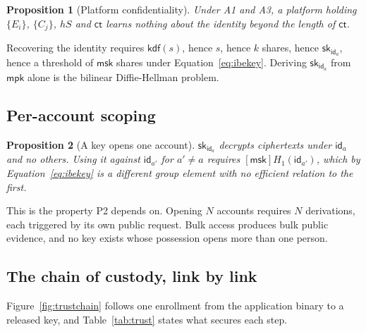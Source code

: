 \documentclass[11pt,a4paper]{article}
\newtheorem{proposition}{Proposition}
\begin{document}
\begin{proposition}[Platform confidentiality]
Under A1 and A3, a platform holding $\{E_i\}$, $\{C_j\}$, $hS$ and $\mathsf{ct}$
learns nothing about the identity beyond the length of $\mathsf{ct}$.
\end{proposition}

Recovering the identity requires $\mathsf{kdf}(s)$, hence $s$, hence $k$ shares,
hence $\mathsf{sk}_{\mathsf{id}_a}$, hence a threshold of $\mathsf{msk}$ shares
under Equation~\ref{eq:ibekey}. Deriving $\mathsf{sk}_{\mathsf{id}_a}$ from
$\mathsf{mpk}$ alone is the bilinear Diffie-Hellman problem.

\subsection{Per-account scoping}

\begin{proposition}[A key opens one account]
$\mathsf{sk}_{\mathsf{id}_a}$ decrypts ciphertexts under $\mathsf{id}_a$ and no
others. Using it against $\mathsf{id}_{a'}$ for $a' \neq a$ requires
$[\mathsf{msk}]H_1(\mathsf{id}_{a'})$, which by Equation~\ref{eq:ibekey} is a
different group element with no efficient relation to the first.
\end{proposition}

This is the property P2 depends on. Opening $N$ accounts requires $N$ derivations,
each triggered by its own public request. Bulk access produces bulk public
evidence, and no key exists whose possession opens more than one person.

\subsection{The chain of custody, link by link}

Figure~\ref{fig:trustchain} follows one enrollment from the application binary to
a released key, and Table~\ref{tab:trust} states what secures each step.
\end{document}
